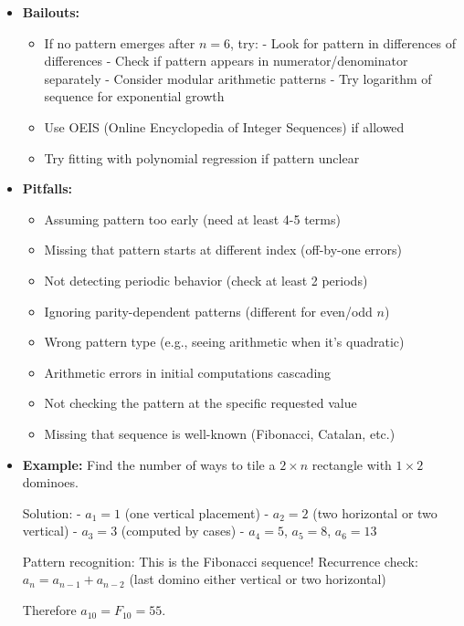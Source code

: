 \documentclass[12pt]{article}
\begin{document}
\begin{itemize}
    \item \textbf{Bailouts:} 
    \begin{itemize}
        \item If no pattern emerges after $n=6$, try:
            - Look for pattern in differences of differences
            - Check if pattern appears in numerator/denominator separately
            - Consider modular arithmetic patterns
            - Try logarithm of sequence for exponential growth
        \item Use OEIS (Online Encyclopedia of Integer Sequences) if allowed
        \item Try fitting with polynomial regression if pattern unclear
    \end{itemize}
    
    \item \textbf{Pitfalls:} 
    \begin{itemize}
        \item Assuming pattern too early (need at least 4-5 terms)
        \item Missing that pattern starts at different index (off-by-one errors)
        \item Not detecting periodic behavior (check at least 2 periods)
        \item Ignoring parity-dependent patterns (different for even/odd $n$)
        \item Wrong pattern type (e.g., seeing arithmetic when it's quadratic)
        \item Arithmetic errors in initial computations cascading
        \item Not checking the pattern at the specific requested value
        \item Missing that sequence is well-known (Fibonacci, Catalan, etc.)
    \end{itemize}
    
    \item \textbf{Example:} Find the number of ways to tile a $2 \times n$ rectangle with $1 \times 2$ dominoes.
    
    Solution: 
    - $a_1 = 1$ (one vertical placement)
    - $a_2 = 2$ (two horizontal or two vertical)
    - $a_3 = 3$ (computed by cases)
    - $a_4 = 5$, $a_5 = 8$, $a_6 = 13$
    
    Pattern recognition: This is the Fibonacci sequence! 
    Recurrence check: $a_n = a_{n-1} + a_{n-2}$ (last domino either vertical or two horizontal)
    
    Therefore $a_{10} = F_{10} = 55$.
\end{itemize}
\end{document}
